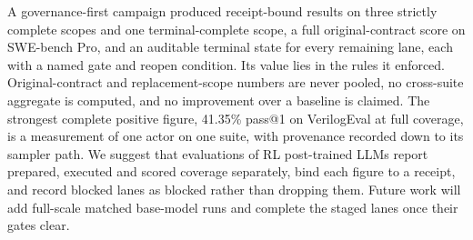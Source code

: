\documentclass[runningheads]{llncs}
\begin{document}
A governance-first campaign produced receipt-bound results on three strictly
complete scopes and one terminal-complete scope, a full original-contract score on SWE-bench Pro, and an auditable
terminal state for every remaining lane, each with a named gate and reopen
condition. Its value lies in the rules it enforced. Original-contract and
replacement-scope numbers are never pooled, no cross-suite aggregate is
computed, and no improvement over a baseline is claimed. The strongest complete
positive figure, 41.35\% pass@1 on VerilogEval at full coverage, is a
measurement of one actor on one suite, with provenance recorded down to its
sampler path. We suggest that evaluations of RL post-trained LLMs report
prepared, executed and scored coverage separately, bind each figure to a
receipt, and record blocked lanes as blocked rather than dropping them. Future work will add full-scale matched base-model runs and complete the
staged lanes once their gates clear.



\end{document}

